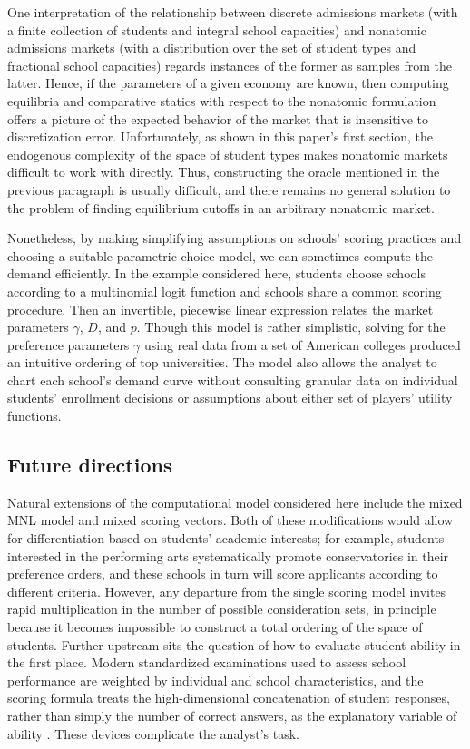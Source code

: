 \documentclass[12pt]{article}
\numberwithin{equation}{subsection}
\theoremstyle{definition}
\begin{document}
One interpretation of the relationship between discrete admissions markets (with a finite collection of students and integral school capacities) and nonatomic admissions markets (with a distribution over the set of student types and fractional school capacities) regards instances of the former as samples from the latter. Hence, if the parameters of a given economy are known, then computing equilibria and comparative statics with respect to the nonatomic formulation offers a picture of the expected behavior of the market that is insensitive to discretization error. Unfortunately, as shown in this paper's first section, the endogenous complexity of the space of student types makes nonatomic markets difficult to work with directly. Thus, constructing the oracle mentioned in the previous paragraph is usually difficult, and there remains no general solution to the problem of finding equilibrium cutoffs in an arbitrary nonatomic market.

Nonetheless, by making simplifying assumptions on schools' scoring practices and choosing a suitable parametric choice model, we can sometimes compute the demand efficiently. In the example considered here, students choose schools according to a multinomial logit function and schools share a common scoring procedure. Then an invertible, piecewise linear expression relates the market parameters $\gamma$, $D$, and $p$. Though this model is rather simplistic, solving for the preference parameters $\gamma$ using real data from a set of American colleges produced an intuitive ordering of top universities. The model also allows the analyst to chart each school's demand curve without consulting granular data on individual students' enrollment decisions or assumptions about either set of players' utility functions. 

\subsection{Future directions}
Natural extensions of the computational model considered here include the mixed MNL model and mixed scoring vectors. Both of these modifications would allow for differentiation based on students' academic interests; for example, students interested in the performing arts systematically promote conservatories in their preference orders, and these schools in turn will score applicants according to different criteria. However, any departure from the single scoring model invites rapid multiplication in the number of possible consideration sets, in principle because it becomes impossible to construct a total ordering of the space of students. Further upstream sits the question of how to evaluate student ability in the first place. Modern standardized examinations used to assess school performance are weighted by individual and school characteristics, and the scoring formula treats the high-dimensional concatenation of student responses, rather than simply the number of correct answers, as the explanatory variable of ability \parencite[][]{measurementofstudentability}. These devices complicate the analyst's task.
\end{document}

